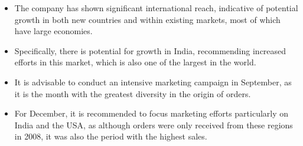 \documentclass{article}
\begin{document}
\begin{itemize}
    \item The company has shown significant international reach, indicative of potential growth in both new countries and within existing markets, most of which have large economies.
    \item Specifically, there is potential for growth in India, recommending increased efforts in this market, which is also one of the largest in the world.
    \item It is advisable to conduct an intensive marketing campaign in September, as it is the month with the greatest diversity in the origin of orders.
    \item For December, it is recommended to focus marketing efforts particularly on India and the USA, as although orders were only received from these regions in 2008, it was also the period with the highest sales.
\end{itemize}
\end{document}
